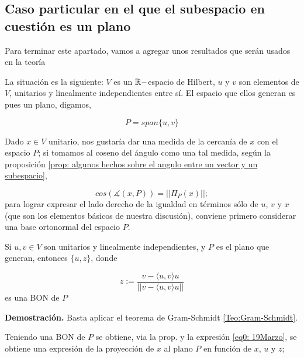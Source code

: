 \QEDB
\vspace{0.2cm}






\subsection{Caso particular en el que el subespacio en cuestión es un plano}

Para terminar este apartado, vamos a
agregar unos resultados que serán usados en la teoría


La situación es la siguiente: $V$ es un $\mathbb{R}-$espacio
de Hilbert, $u$ y $v$ son elementos de $V$,
unitarios y linealmente
independientes entre sí. El espacio que ellos generan
es pues un plano, digamos,


\[
P= span \{ u, v \}
\]

Dado $x \in V$ unitario, nos gustaría dar una medida
de la cercanía de $x$ con el espacio $P$; si tomamos
al coseno del ángulo como una tal medida, según la proposición
\ref{prop: algunos hechos sobre el angulo entre un vector y un subespacio},

\begin{equation}
\label{eq0: 19Marzo}
cos \left( \measuredangle (x, P) \right) = || \Pi_{P}(x) ||;
\end{equation}
para lograr expresar el lado derecho de la igualdad en términos
sólo de $u$, $v$ y $x$ (que son los elementos básicos de
nuestra discusión), conviene primero considerar una base
ortonormal del espacio $P$.


\begin{obs}
Si $u, v \in V$ son unitarios y linealmente independientes, y $P$
es el plano que generan, entonces
$\{ u, z \}$, donde

\begin{equation}
\label{eq2: 19Marzo}
z:= \frac{v- \langle u, v \rangle u}{||v- \langle u, v \rangle u||}
\end{equation}
es una BON de $P$
\end{obs}
\noindent
\textbf{Demostración.}
Basta aplicar el teorema de Gram-Schmidt 
\ref{Teo:Gram-Schmidt}.
\QEDB
\vspace{0.2cm}

Teniendo una BON de $P$ se obtiene, via la prop.
y la expresión \eqref{eq0: 19Marzo},
se obtiene una expresión de la proyección de $x$ al plano $P$ en función
de $x$, $u$ y $z$;

